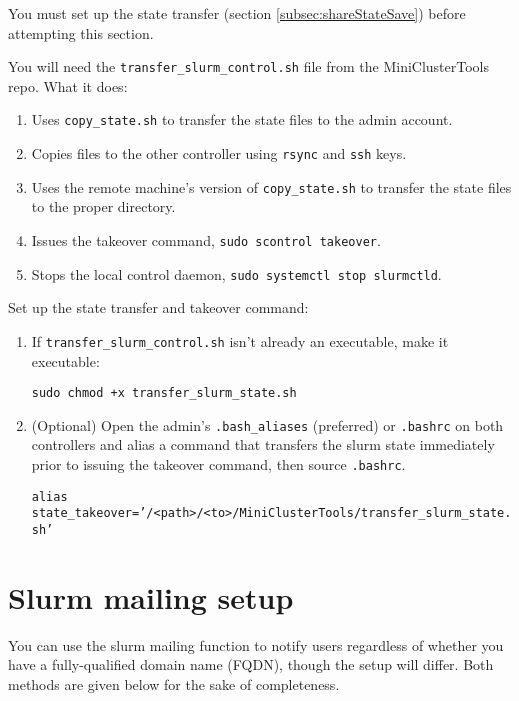 You must set up the state transfer (section \ref{subsec:shareStateSave}) before attempting this section.

You will need the \texttt{transfer\_slurm\_control.sh} file from the MiniClusterTools repo. What it does:

\begin{enumerate}
  \item Uses \texttt{copy\_state.sh} to transfer the state files to the admin account.

  \item Copies files to the other controller using \texttt{rsync} and \texttt{ssh} keys.

  \item Uses the remote machine's version of \texttt{copy\_state.sh} to transfer the state files to the proper directory.

  \item Issues the takeover command, \texttt{sudo scontrol takeover}.

  \item Stops the local control daemon, \texttt{sudo systemctl stop slurmctld}.
\end{enumerate}

\noindent Set up the state transfer and takeover command:

\begin{enumerate}
  \item If \texttt{transfer\_slurm\_control.sh} isn't already an executable, make it executable:

    \texttt{sudo chmod +x transfer\_slurm\_state.sh}

  \item (Optional) Open the admin's \texttt{.bash\_aliases} (preferred) or \texttt{.bashrc} on both controllers and alias a command that transfers the slurm state immediately prior to issuing the takeover command, then source \texttt{.bashrc}.

    \texttt{alias state\_takeover='/<path>/<to>/MiniClusterTools/transfer\_slurm\_state.sh'}
\end{enumerate}

\section{Slurm mailing setup} \label{sec:slurmmail}

You can use the slurm mailing function to notify users regardless of whether you have a fully-qualified domain name (FQDN), though the setup will differ. Both methods are given below for the sake of completeness.

